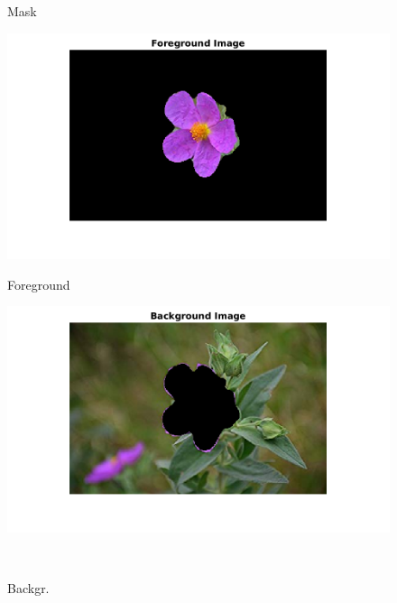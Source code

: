 \documentclass[12pt, a4paper]{article}
\begin{document}
\begin{figure}[h!]
\begin{minipage}[c][1\width]{0.3\textwidth}
    	\null\vspace*{-28pt}
    	\caption{Mask}
	    \label{fig:3.1(b)}
    \end{minipage}
    \renewcommand{\thefigure}{3.1(c)}
    \begin{minipage}[c][1\width]{0.3\textwidth}
    	\hspace*{-0.5in}
    	\includegraphics[width=1.5\textwidth]{flower_foreground.png}
    	\null\vspace*{-28pt}
    	\caption{Foreground}
	    \label{fig:3.1(c)}
    \end{minipage}
    \renewcommand{\thefigure}{3.1(d)}
    \begin{minipage}[c][1\width]{0.3\textwidth}
    	\includegraphics[width=1.5\textwidth]{flower_background.png}
    	\null\vspace*{-28pt}
    	\caption{Backgr.}
	    \label{fig:3.1(d)}
    \end{minipage}
	\\
    \renewcommand{\thefigure}{3.2(a)}
    \begin{minipage}[c][1\width]{0.3\textwidth}

\end{minipage}
\end{figure}
\end{document}
